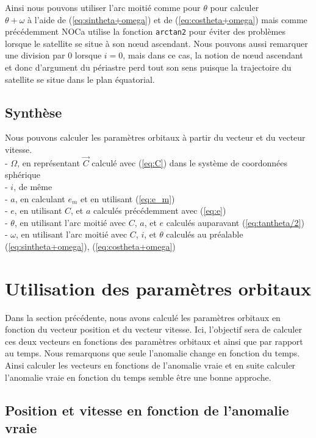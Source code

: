 \documentclass{report}
\begin{document}
Ainsi nous pouvons utiliser l'arc moitié comme pour $\theta$ pour calculer \\$\theta+\omega$ à l'aide de (\ref{eq:sintheta+omega}) et de (\ref{eq:costheta+omega}) mais comme précédemment NOCa utilise la fonction \verb|arctan2| pour éviter des problèmes lorsque le satellite se situe à son nœud ascendant. Nous pouvons aussi remarquer une division par $0$ lorsque $i=0$, mais dans ce cas, la notion de nœud ascendant et donc d'argument du périastre perd tout son sens puisque la trajectoire du satellite se situe dans le plan équatorial.

\subsection{Synthèse}

Nous pouvons calculer les paramètres orbitaux à partir du vecteur et du vecteur vitesse.\\
- $\Omega$, en représentant $\overrightarrow C$ calculé avec (\ref{eq:C}) dans le système de coordonnées sphérique\\
- $i$, de même\\
- $a$, en calculant $e_m$ et en utilisant (\ref{eq:e_m})\\
- $e$, en utilisant $C$, et $a$ calculés précédemment avec (\ref{eq:e})\\
- $\theta$, en utilisant l'arc moitié avec $C$, $a$, et $e$ calculés auparavant (\ref{eq:tantheta/2})\\
- $\omega$, en utilisant l'arc moitié avec $C$, $i$, et $\theta$ calculés au préalable (\ref{eq:sintheta+omega}), (\ref{eq:costheta+omega})

\section{Utilisation des paramètres orbitaux}

Dans la section précédente, nous avons calculé les paramètres orbitaux en fonction du vecteur position et du vecteur vitesse. Ici, l'objectif sera de calculer ces deux vecteurs en fonctions des paramètres orbitaux et ainsi que par rapport au temps. Nous remarquons que seule l'anomalie change en fonction du temps. Ainsi calculer les vecteurs en fonctions de l'anomalie vraie et en suite calculer l'anomalie vraie en fonction du temps semble être une bonne approche.

\subsection{Position et vitesse en fonction de l'anomalie vraie}
\end{document}
